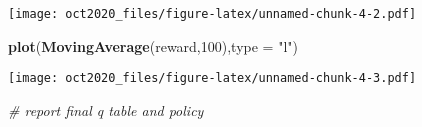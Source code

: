\documentclass[
]{article}
\newenvironment{Shaded}{\begin{snugshade}}{\end{snugshade}}
\newcommand{\AttributeTok}[1]{\textcolor[rgb]{0.13,0.29,0.53}{#1}}
\newcommand{\CommentTok}[1]{\textcolor[rgb]{0.56,0.35,0.01}{\textit{#1}}}
\newcommand{\DecValTok}[1]{\textcolor[rgb]{0.00,0.00,0.81}{#1}}
\newcommand{\FunctionTok}[1]{\textcolor[rgb]{0.13,0.29,0.53}{\textbf{#1}}}
\newcommand{\NormalTok}[1]{#1}
\newcommand{\StringTok}[1]{\textcolor[rgb]{0.31,0.60,0.02}{#1}}
\begin{document}
\texttt{[image: oct2020\_files/figure-latex/unnamed-chunk-4-2.pdf]}

\begin{Shaded}
\begin{Highlighting}[]
\FunctionTok{plot}\NormalTok{(}\FunctionTok{MovingAverage}\NormalTok{(reward,}\DecValTok{100}\NormalTok{),}\AttributeTok{type =} \StringTok{"l"}\NormalTok{)}
\end{Highlighting}
\end{Shaded}

\texttt{[image: oct2020\_files/figure-latex/unnamed-chunk-4-3.pdf]}

\begin{Shaded}
\begin{Highlighting}[]
\CommentTok{\# report final q table and policy}
\end{Highlighting}
\end{Shaded}
\end{document}
